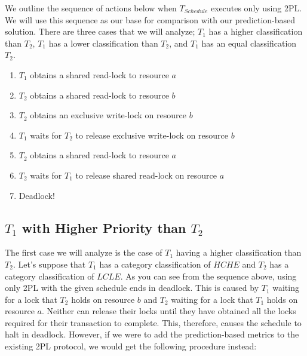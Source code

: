 We outline the sequence of actions below when $T_{Schedule}$ executes only using 2PL. We will use this sequence as our base for comparison with our prediction-based solution. There are three cases that we will analyze; $T_{1}$ has a higher classification than $T_{2}$, $T_{1}$ has a lower classification than $T_{2}$, and $T_{1}$ has an equal classification $T_{2}$.

\begin{enumerate}
  \item $T_{1}$ obtains a shared read-lock to resource $a$
  \item $T_{2}$ obtains a shared read-lock to resource $b$
  \item $T_{2}$ obtains an exclusive write-lock on resource $b$
  \item $T_{1}$ waits for $T_{2}$ to release exclusive write-lock on resource $b$
  \item $T_{2}$ obtains a shared read-lock to resource $a$
  \item $T_{2}$ waits for $T_{1}$ to release shared read-lock on resource $a$
  \item Deadlock!
\end{enumerate}

\subsection{\texorpdfstring{$T_{1}$ with Higher Priority than $T_{2}$}{}}
\label{sec:t1_higher_than_t2}
The first case we will analyze is the case of $T_{1}$ having a higher classification than $T_{2}$. Let's suppose that $T_{1}$ has a category classification of $HCHE$ and $T_{2}$ has a category classification of $LCLE$. As you can see from the sequence above, using only 2PL with the given schedule ends in deadlock. This is caused by $T_{1}$ waiting for a lock that $T_{2}$ holds on resource $b$ and $T_{2}$ waiting for a lock that $T_{1}$ holds on resource $a$. Neither can release their locks until they have obtained all the locks required for their transaction to complete. This, therefore, causes the schedule to halt in deadlock. However, if we were to add the prediction-based metrics to the existing 2PL protocol, we would get the following procedure instead:

